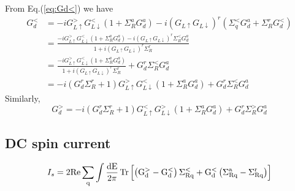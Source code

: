 \documentclass[11pt,a4paper]{article}
\begin{document}
From Eq.(\ref{eq:Gd<}) we have
\begin{equation}
\begin{split}
G_{d}^{<}&=-i G_{L \uparrow}^{>} G_{L \downarrow}^{<}\left(1+\Sigma_{R}^{a} G_{d}^{a}\right)-i\left(G_{L \uparrow} G_{L \downarrow}\right)^{r}\left(\Sigma_{q}^{<} G_{d}^{a}+\Sigma_{R}^{r} G_{d}^{<}\right)\\
&=\frac{-i G_{L \uparrow}^{>} G_{L \downarrow}^{<}\left(1+\Sigma_{R}^{a} G_{d}^{a}\right) - i\left(G_{L \uparrow} G_{L \downarrow}\right)^{r}\Sigma_{R}^{<} G_{d}^{a}}{1+i\left(G_{L \uparrow} G_{L \downarrow}\right)^{r}\Sigma_{R}^{r}} \\
&=\frac{-i G_{L \uparrow}^{>} G_{L \downarrow}^{<}\left(1+\Sigma_{R}^{a} G_{d}^{a}\right)}{1+i\left(G_{L \uparrow} G_{L \downarrow}\right)^{r}\Sigma_{R}^{r}} + G_{d}^{r}\Sigma_{R}^{<} G_{d}^{a}\\
&=-i(G_{d}^{r}\Sigma_{R}^{r}+1) G_{L \uparrow}^{>} G_{L \downarrow}^{<}\left(1+\Sigma_{R}^{a} G_{d}^{a}\right) + G_{d}^{r}\Sigma_{R}^{<} G_{d}^{a}
\end{split}
\end{equation}
Similarly,
\begin{equation}
G_{d}^{>}=-i\left(G_{d}^{r} \Sigma_{R}^{r}+1\right) G_{L \uparrow}^{<} G_{L \downarrow}^{>}\left(1+\Sigma_{R}^{a} G_{d}^{a}\right)+G_{d}^{r} \Sigma_{R}^{>} G_{d}^{a}
\end{equation}
\subsection{DC spin current}

\begin{equation}
I_{s}= 2\rm{Re}\sum_{q} \int  \frac{dE}{2\pi}\operatorname{Tr}\left[\left(G_{d}^{>}-G_{d}^{<}\right) \Sigma_{R q}^{<}+G_{d}^{<}\left(\Sigma_{R q}^{a}-\Sigma_{R q}^{r}\right)\right]
\label{eq:current1}
\end{equation}
\end{document}
